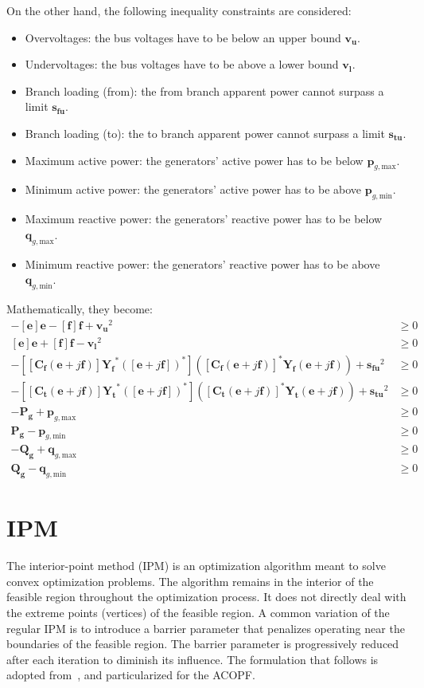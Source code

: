 \documentclass{article}
\begin{document}
On the other hand, the following inequality constraints are considered:
\begin{itemize}
    \item Overvoltages: the bus voltages have to be below an upper bound $\bm{v_u}$.
    \item Undervoltages: the bus voltages have to be above a lower bound $\bm{v_l}$.
    \item Branch loading (from): the from branch apparent power cannot surpass a limit $\bm{s_{fu}}$. 
    \item Branch loading (to): the to branch apparent power cannot surpass a limit $\bm{s_{tu}}$. 
    \item Maximum active power: the generators' active power has to be below $\bm{p}_{g,\text{max}}$.
    \item Minimum active power: the generators' active power has to be above $\bm{p}_{g,\text{min}}$.
    \item Maximum reactive power: the generators' reactive power has to be below $\bm{q}_{g,\text{max}}$.
    \item Minimum reactive power: the generators' reactive power has to be above $\bm{q}_{g,\text{min}}$.
\end{itemize}
Mathematically, they become:
\begin{align}
    - [\bm{e}]\bm{e} - [\bm{f}]\bm{f} + \bm{v_u}^2 & \geq 0 \\
    [\bm{e}]\bm{e} + [\bm{f}]\bm{f} - \bm{v_l}^2 & \geq 0 \\
    - [[\bm{C_f}(\bm{e} + j\bm{f})]\bm{Y_f}^* ([\bm{e} + j\bm{f}])^*] ([\bm{C_f}(\bm{e} + j\bm{f})]^* \bm{Y_f}(\bm{e} + j\bm{f})) + \bm{s_{fu}}^2 & \geq 0 \\
    - [[\bm{C_t}(\bm{e} + j\bm{f})]\bm{Y_t}^* ([\bm{e} + j\bm{f}])^*] ([\bm{C_t}(\bm{e} + j\bm{f})]^* \bm{Y_t}(\bm{e} + j\bm{f})) + \bm{s_{tu}}^2 & \geq 0 \\
    - \bm{P_g} + \bm{p}_{g,\text{max}} & \geq 0 \\
    \bm{P_g} - \bm{p}_{g,\text{min}} & \geq 0 \\
    - \bm{Q_g} + \bm{q}_{g,\text{max}} & \geq 0 \\
    \bm{Q_g} - \bm{q}_{g,\text{min}} & \geq 0
\end{align}

\section{IPM}
The interior-point method (IPM) is an optimization algorithm meant to solve convex optimization problems. The algorithm remains in the interior of the feasible region throughout the optimization process. It does not directly deal with the extreme points (vertices) of the feasible region. A common variation of the regular IPM is to introduce a barrier parameter that penalizes operating near the boundaries of the feasible region. The barrier parameter is progressively reduced after each iteration to diminish its influence. The formulation that follows is adopted from~\cite{nocedal1999numerical}, and particularized for the ACOPF.
\end{document}
